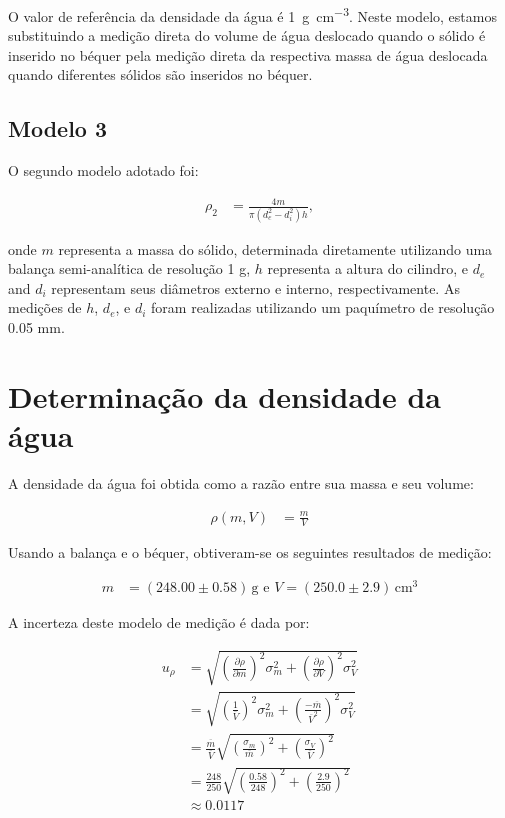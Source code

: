 \documentclass{article}
\begin{document}
\begin{multicols}{2}
O valor de referência da densidade da água é \SI{1}{\gram\per\centi\meter\cubed}. Neste modelo, estamos substituindo a medição direta do volume de água deslocado quando o sólido é inserido no béquer pela medição direta da respectiva massa de água deslocada quando diferentes sólidos são inseridos no béquer.

\subsection{Modelo 3}
O segundo modelo adotado foi:

\begin{align}
\rho_2 &= \frac{4m}{\pi(d_e^2 - d_i^2)h},
\end{align}

onde $m$ representa a massa do sólido, determinada diretamente utilizando uma balança semi-analítica de resolução 1 g, $h$ representa a altura do cilindro, e $d_e$ and $d_i$ representam seus diâmetros externo e interno, respectivamente. As medições de $h$, $d_e$, e $d_i$ foram realizadas utilizando um paquímetro de resolução 0.05 mm.

\section{Determinação da densidade da água}
A densidade da água foi obtida como a razão entre sua massa e seu volume:

\begin{align}
\rho(m, V) &= \frac{m}{V}
\end{align}

Usando a balança e o béquer, obtiveram-se os seguintes resultados de medição:

\begin{align}
m &= (248.00 \pm 0.58) \, \text{g e } V = (250.0 \pm 2.9) \, \text{cm}^3
\end{align}

A incerteza deste modelo de medição é dada por:

\begin{align}
u_{\rho} &= \sqrt{\left(\frac{\partial \rho}{\partial m}\right)^2 \sigma^2_m + \left(\frac{\partial \rho}{\partial V}\right)^2 \sigma^2_V} \\
&= \sqrt{\left(\frac{1}{\overline{V}}\right)^2 \sigma^2_m + \left(\frac{-\overline{m}}{\overline{V}^2}\right)^2 \sigma^2_V} \nonumber \\
&= \frac{\overline{m}}{\overline{V}} \sqrt{\left(\frac{\sigma_m}{\overline{m}}\right)^2 + \left(\frac{\sigma_V}{\overline{V}}\right)^2} \nonumber \\
&= \frac{248}{250} \sqrt{\left(\frac{0.58}{248}\right)^2 + \left(\frac{2.9}{250}\right)^2} \nonumber \\
&\approx 0.0117 \nonumber
\end{align}


\end{multicols}
\end{document}
